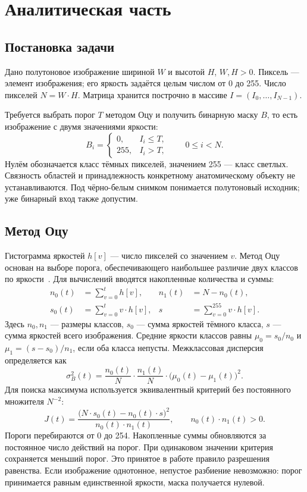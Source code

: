 \clearpage\section{Аналитическая часть}
\subsection{Постановка задачи}
Дано полутоновое изображение шириной $W$ и высотой $H$, $W,H>0$. Пиксель --- элемент изображения; его яркость задаётся целым числом от 0 до 255. Число пикселей $N=W\cdot H$. Матрица хранится построчно в массиве $I=(I_0,\ldots,I_{N-1})$.

Требуется выбрать порог $T$ методом Оцу и получить бинарную маску $B$, то есть изображение с двумя значениями яркости:
\begin{equation}\label{eq:mask}
B_i=\begin{cases}0,&I_i\le T,\\255,&I_i>T,\end{cases}\qquad 0\le i<N.
\end{equation}
Нулём обозначается класс тёмных пикселей, значением 255 --- класс светлых. Связность областей и принадлежность конкретному анатомическому объекту не устанавливаются. Под чёрно-белым снимком понимается полутоновый исходник; уже бинарный вход также допустим.

\subsection{Метод Оцу}
Гистограмма яркостей $h[v]$ --- число пикселей со значением $v$. Метод Оцу основан на выборе порога, обеспечивающего наибольшее различие двух классов по яркости~\cite{otsu}. Для вычислений вводятся накопленные количества и суммы:
\begin{equation}\label{eq:sums}
\begin{aligned}
n_0(t)&=\sum_{v=0}^{t}h[v], & n_1(t)&=N-n_0(t),\\
s_0(t)&=\sum_{v=0}^{t}v\cdot h[v], & s&=\sum_{v=0}^{255}v\cdot h[v].
\end{aligned}
\end{equation}
Здесь $n_0,n_1$ --- размеры классов, $s_0$ --- сумма яркостей тёмного класса, $s$ --- сумма яркостей всего изображения. Средние яркости классов равны $\mu_0=s_0/n_0$ и $\mu_1=(s-s_0)/n_1$, если оба класса непусты. Межклассовая дисперсия определяется как
\begin{equation}
\sigma_B^2(t)=\frac{n_0(t)}{N}\cdot\frac{n_1(t)}{N}\cdot\bigl(\mu_0(t)-\mu_1(t)\bigr)^2.
\end{equation}
Для поиска максимума используется эквивалентный критерий без постоянного множителя $N^{-2}$:
\begin{equation}\label{eq:criterion}
J(t)=\frac{\bigl(N\cdot s_0(t)-n_0(t)\cdot s\bigr)^2}{n_0(t)\cdot n_1(t)},\qquad n_0(t)\cdot n_1(t)>0.
\end{equation}
Пороги перебираются от 0 до 254. Накопленные суммы обновляются за постоянное число действий на порог. При одинаковом значении критерия сохраняется меньший порог. Это принятое в работе правило разрешения равенства. Если изображение однотонное, непустое разбиение невозможно: порог принимается равным единственной яркости, маска получается нулевой.

